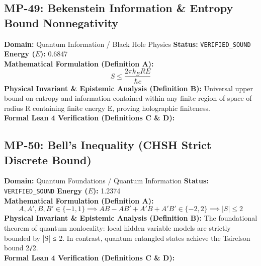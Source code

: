 \subsection{MP-49: Bekenstein Information \& Entropy Bound Nonnegativity}
\textbf{Domain:} Quantum Information / Black Hole Physics \hfill \textbf{Status:} \texttt{VERIFIED\_SOUND} \hfill \textbf{Energy ($E$):} 0.6847\\
\textbf{Mathematical Formulation (Definition A):}
\begin{equation*}
S \le \frac{2\pi k_B R E}{\hbar c}
\end{equation*}
\textbf{Physical Invariant \& Epistemic Analysis (Definition B):}
Universal upper bound on entropy and information contained within any finite region of space of radius R containing finite energy E, proving holographic finiteness.\\

\textbf{Formal Lean 4 Verification (Definitions C \& D):}


\vspace{1em}
\subsection{MP-50: Bell's Inequality (CHSH Strict Discrete Bound)}
\textbf{Domain:} Quantum Foundations / Quantum Information \hfill \textbf{Status:} \texttt{VERIFIED\_SOUND} \hfill \textbf{Energy ($E$):} 1.2374\\
\textbf{Mathematical Formulation (Definition A):}
\begin{equation*}
A, A', B, B' \in \{-1, 1\} \implies A B - A B' + A' B + A' B' \in \{-2, 2\} \implies |S| \le 2
\end{equation*}
\textbf{Physical Invariant \& Epistemic Analysis (Definition B):}
The foundational theorem of quantum nonlocality: local hidden variable models are strictly bounded by |S| ≤ 2. In contrast, quantum entangled states achieve the Tsirelson bound 2√2.\\

\textbf{Formal Lean 4 Verification (Definitions C \& D):}


\vspace{1em}
\newpage
